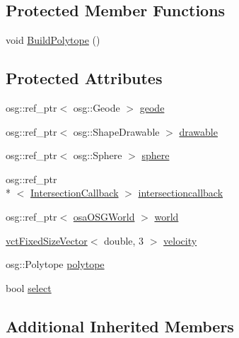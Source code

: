 \subsection*{Protected Member Functions}
\begin{DoxyCompactItemize}
\item 
void \hyperlink{classosa_o_s_g_pointer3_d_a86a35fd43800ca80364a27ea13780013}{Build\-Polytope} ()
\end{DoxyCompactItemize}
\subsection*{Protected Attributes}
\begin{DoxyCompactItemize}
\item 
osg\-::ref\-\_\-ptr$<$ osg\-::\-Geode $>$ \hyperlink{classosa_o_s_g_pointer3_d_af706c282ea0f7b14ae0b430a3b769510}{geode}
\item 
osg\-::ref\-\_\-ptr$<$ osg\-::\-Shape\-Drawable $>$ \hyperlink{classosa_o_s_g_pointer3_d_ab6c2c828a3e43d02bb12dac34b12cbbc}{drawable}
\item 
osg\-::ref\-\_\-ptr$<$ osg\-::\-Sphere $>$ \hyperlink{classosa_o_s_g_pointer3_d_a3f2f4ea0fac395d6b6a8cb20af610d9d}{sphere}
\item 
osg\-::ref\-\_\-ptr\\*
$<$ \hyperlink{classosa_o_s_g_pointer3_d_1_1_intersection_callback}{Intersection\-Callback} $>$ \hyperlink{classosa_o_s_g_pointer3_d_add1c2a935b2af684bf2cc3c180410a1c}{intersectioncallback}
\item 
osg\-::ref\-\_\-ptr$<$ \hyperlink{classosa_o_s_g_world}{osa\-O\-S\-G\-World} $>$ \hyperlink{classosa_o_s_g_pointer3_d_a6576d36096a1c3a9127fbf9dbafee677}{world}
\item 
\hyperlink{classvct_fixed_size_vector}{vct\-Fixed\-Size\-Vector}$<$ double, 3 $>$ \hyperlink{classosa_o_s_g_pointer3_d_a9ed8936280696f8f7bd78bb1d20e7d81}{velocity}
\item 
osg\-::\-Polytope \hyperlink{classosa_o_s_g_pointer3_d_a99d8f639a80c650298763ab6f28c711a}{polytope}
\item 
bool \hyperlink{classosa_o_s_g_pointer3_d_acd02af84dcccbf5bb89fda754600414d}{select}
\end{DoxyCompactItemize}
\subsection*{Additional Inherited Members}


